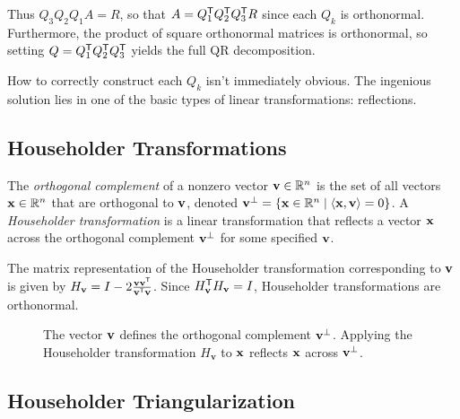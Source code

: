 Thus $Q_3 Q_2 Q_1 A = R$, so that $A = Q_1^{\mathsf T} Q_2^{\mathsf T} Q_3^{\mathsf T} R$ since each $Q_k$ is orthonormal.
Furthermore, the product of square orthonormal matrices is orthonormal, so setting $Q = Q_1^{\mathsf T} Q_2^{\mathsf T} Q_3^{\mathsf T}$ yields the full QR decomposition.

How to correctly construct each $Q_k$ isn't immediately obvious.
The ingenious solution lies in one of the basic types of linear transformations: reflections.

\subsection*{Householder Transformations} %

The \emph{orthogonal complement} of a nonzero vector $\mathbf{v} \in \mathbb{R}^n$ is the set of all vectors $\mathbf{x} \in \mathbb{R}^n$ that are orthogonal to $\mathbf{v}$, denoted $\mathbf{v}^\perp = \{ \mathbf{x} \in \mathbb{R}^n \mid \langle \mathbf{x}, \mathbf{v} \rangle = 0 \}$.
A \emph{Householder transformation} is a linear transformation that reflects a vector $\mathbf{x}$ across the orthogonal complement $\mathbf{v}^\perp$ for some specified $\mathbf{v}$.

The matrix representation of the Householder transformation corresponding to $\mathbf{v}$ is given by $H_{\mathbf{v}} = I - 2\frac{\mathbf{v}\mathbf{v}^{\mathsf T}}{\mathbf{v}^{\mathsf T}\mathbf{v}}$.
Since $H_{\mathbf{v}}^{\mathsf T} H_{\mathbf{v}} = I$, Householder transformations are orthonormal.

\begin{figure}[H]
\centering
{}
\caption{The vector $\mathbf{v}$ defines the orthogonal complement $\mathbf{v}^\perp$.
Applying the Householder transformation $H_{\mathbf{v}}$ to $\mathbf{x}$ reflects $\mathbf{x}$ across $\mathbf{v}^\perp$.}
\label{fig:Householder_reflector}
\end{figure}

\subsection*{Householder Triangularization} %

